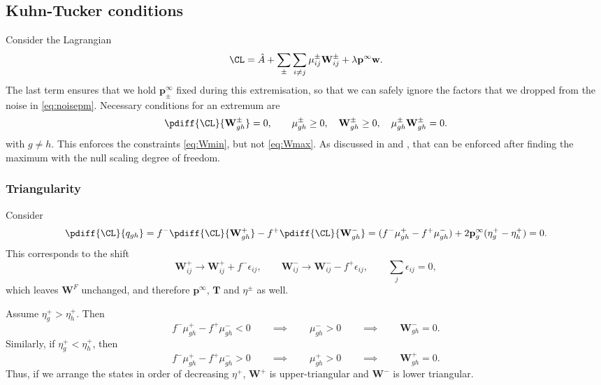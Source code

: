 \documentclass[12pt]{article}
\newcommand{\eq}{\mathbf{p}^\infty}
\newcommand{\fpt}{\mathbf{T}}
\newcommand{\w}{\mathbf{w}}
\newcommand{\W}{\mathbf{W}}
\begin{document}
\subsection{Kuhn-Tucker conditions}\label{sec:kuhntucker}

Consider the Lagrangian
%
\begin{equation}\label{eq:lagrangian}
  \CL = \hat{A} + \sum_{\pm}\sum_{i\neq j} \mu^\pm_{ij} \W^\pm_{ij} +\lambda\eq\w.
\end{equation}
%
The last term ensures that we hold $\eq_\pm$ fixed during this extremisation, so that we can safely ignore the factors that we dropped from the noise in \eqref{eq:noisepm}.
Necessary conditions for an extremum are
%
\begin{equation}\label{eq:extremum}
  \pdiff{\CL}{\W^\pm_{gh}} = 0,
  \qquad
    \mu^\pm_{gh} \geq 0,\quad
    \W^\pm_{gh} \geq 0,\quad
    \mu^\pm_{gh}\W^\pm_{gh} = 0.
\end{equation}
%
with $g \neq h$. This enforces the constraints \eqref{eq:Wmin}, but not \eqref{eq:Wmax}. As discussed in  and , that can be enforced after finding the maximum with the null scaling degree of freedom.

\subsubsection{Triangularity}\label{sec:triangular}

Consider
%
\begin{equation}\label{eq:shiftqderiv}
  \pdiff{\CL}{q_{gh}} =
  f^- \pdiff{\CL}{\W^+_{gh}} - f^+ \pdiff{\CL}{\W^-_{gh}}
   = (f^- \mu^+_{gh} - f^+ \mu^-_{gh}) + 2\eq_g (\eta^+_g - \eta^+_h)
   = 0.
\end{equation}
%
This corresponds to the shift
%
\begin{equation}\label{eq:shiftq}
  \W^+_{ij} \to \W^+_{ij} + f^-\epsilon_{ij},
  \qquad
  \W^-_{ij} \to \W^-_{ij} - f^+\epsilon_{ij},
  \qquad
  \sum_j \epsilon_{ij} = 0,
\end{equation}
%
which leaves $\W^F$ unchanged, and therefore $\eq$, $\fpt$ and $\eta^\pm$ as well.

Assume $\eta^+_g > \eta^+_h$. Then
%
\begin{equation}\label{eq:lowertriangular}
 f^- \mu^+_{gh} - f^+ \mu^-_{gh} <0
 \qquad\implies\qquad
 \mu^-_{gh} >0
 \qquad\implies\qquad
 \W^-_{gh}=0.
\end{equation}
%
Similarly, if $\eta^+_g < \eta^+_h$, then
%
\begin{equation}\label{eq:uppertriangular}
 f^- \mu^+_{gh} - f^+ \mu^-_{gh} > 0
 \qquad\implies\qquad
 \mu^+_{gh} >0
 \qquad\implies\qquad
 \W^+_{gh}=0.
\end{equation}
%
Thus, if we arrange the states in order of decreasing $\eta^+$, $\W^+$ is upper-triangular and $\W^-$ is lower triangular.
\end{document}
